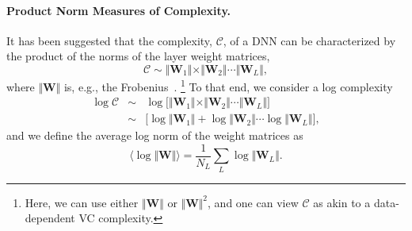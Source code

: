 

\paragraph{Product Norm Measures of Complexity.} 


It has been suggested that the complexity, $\mathcal{C}$, of a DNN can be characterized by the product of the norms of the layer weight matrices,
$$
\mathcal{C}\sim\Vert\mathbf{W}_{1}\Vert\times\Vert\mathbf{W}_{2}\Vert\cdots\Vert\mathbf{W}_{L}\Vert ,
$$
where $\Vert\mathbf{W}\Vert$ is, e.g., the Frobenius~\cite{XXX-XXX,XXX-XXX,XXX-XXX}.%
\footnote{Here, we can use either $\Vert\mathbf{W}\Vert$ or $\Vert\mathbf{W}\Vert^{2}$,
and one can view $\mathcal{C}$ as akin to a data-dependent VC complexity.}
%
To that end, we consider a log complexity
\begin{eqnarray*}
\log\mathcal{C} &\sim& \log\bigg[\Vert\mathbf{W}_{1}\Vert\times\Vert\mathbf{W}_{2}\Vert\cdots\Vert\mathbf{W}_{L}\Vert\bigg]  \\
                &\sim& \bigg[\log\Vert\mathbf{W}_{1}\Vert+\log\Vert\mathbf{W}_{2}\Vert\cdots\log\Vert\mathbf{W}_{L}\Vert\bigg]  ,
\end{eqnarray*}
and we define the average log norm of the weight matrices as
\begin{equation}
\langle\log\Vert\mathbf{W}\Vert\rangle=\dfrac{1}{N_{L}}\sum_{L}\log\Vert\mathbf{W}_{L}\Vert  .
\label{eqn:av_log_norm}
\end{equation}


